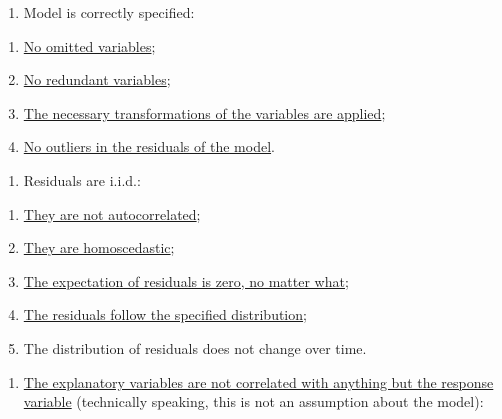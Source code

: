 \documentclass[
]{book}
\providecommand{\tightlist}{%
  \setlength{\itemsep}{0pt}\setlength{\parskip}{0pt}}
\theoremstyle{definition}
\theoremstyle{definition}
\theoremstyle{definition}
\theoremstyle{definition}
\theoremstyle{remark}
\begin{document}
\begin{enumerate}
\def\labelenumi{\arabic{enumi}.}
\tightlist
\item
  Model is correctly specified:
\end{enumerate}

\begin{enumerate}
\def\labelenumi{\alph{enumi}.}
\tightlist
\item
  \protect\hyperlink{diagnosticsOmitted}{No omitted variables};
\item
  \protect\hyperlink{diagnosticsRedundant}{No redundant variables};
\item
  \protect\hyperlink{diagnosticsTransformations}{The necessary transformations of the variables are applied};
\item
  \protect\hyperlink{diagnosticsOutliers}{No outliers in the residuals of the model}.
\end{enumerate}

\begin{enumerate}
\def\labelenumi{\arabic{enumi}.}
\setcounter{enumi}{1}
\tightlist
\item
  Residuals are i.i.d.:
\end{enumerate}

\begin{enumerate}
\def\labelenumi{\alph{enumi}.}
\tightlist
\item
  \protect\hyperlink{diagnosticsResidualsIIDAuto}{They are not autocorrelated};
\item
  \protect\hyperlink{diagnosticsResidualsIIDHetero}{They are homoscedastic};
\item
  \protect\hyperlink{diagnosticsResidualsIIDExpectation}{The expectation of residuals is zero, no matter what};
\item
  \protect\hyperlink{diagnosticsResidualsIIDDistribution}{The residuals follow the specified distribution};
\item
  The distribution of residuals does not change over time.
\end{enumerate}

\begin{enumerate}
\def\labelenumi{\arabic{enumi}.}
\setcounter{enumi}{2}
\tightlist
\item
  \protect\hyperlink{diagnosticsMulticollinearity}{The explanatory variables are not correlated with anything but the response variable} (technically speaking, this is not an assumption about the model):
\end{enumerate}
\end{document}
